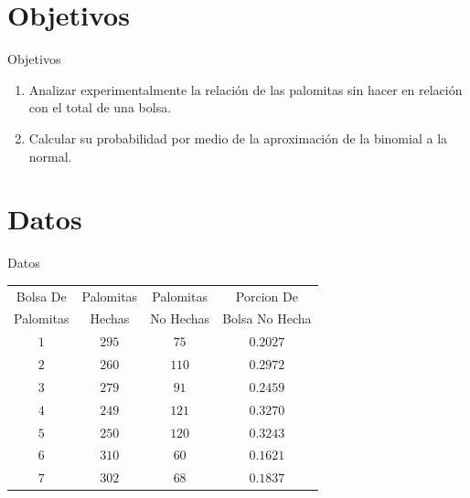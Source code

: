 \documentclass[11pt]{beamer}
\begin{document}
	\section{Objetivos}
		\begin{frame}{Objetivos}
			\begin{block}{}
				\begin{enumerate}
					\vspace{0.5cm}
					\item Analizar experimentalmente la relación de las palomitas sin hacer en relación con el total de una 
						 bolsa.
					\vspace{0.5cm}
					\item Calcular su probabilidad por medio de la aproximación de la binomial a la normal.
					\vspace{0.5cm}
				\end{enumerate}
			\end{block}
		\end{frame}


	\section{Datos}
		\begin{frame}{Datos}
			\begin{table}[h!]
				\centering
				\begin{tabular}{|c|c|c|c|}
					\hline
					Bolsa De & Palomitas & Palomitas & Porcion De \\
					Palomitas & Hechas & No Hechas & Bolsa No Hecha \\\hline
					$ 1 $ & $ 295 $ & $ 75 $ & $ 0.2027 $ \\\hline
					$ 2 $ & $ 260 $ & $ 110 $ & $ 0.2972 $ \\\hline
					$ 3 $ & $ 279 $ & $ 91 $ & $ 0.2459 $ \\\hline
					$ 4 $ & $ 249 $ & $ 121 $ & $ 0.3270 $ \\\hline
					$ 5 $ & $ 250 $ & $ 120 $ & $ 0.3243 $ \\\hline
					$ 6 $ & $ 310 $ & $ 60 $ & $ 0.1621 $ \\\hline
					$ 7 $ & $ 302 $ & $ 68 $ & $ 0.1837 $ \\\hline				
				\end{tabular}
			\end{table}
		\end{frame}
\end{document}
